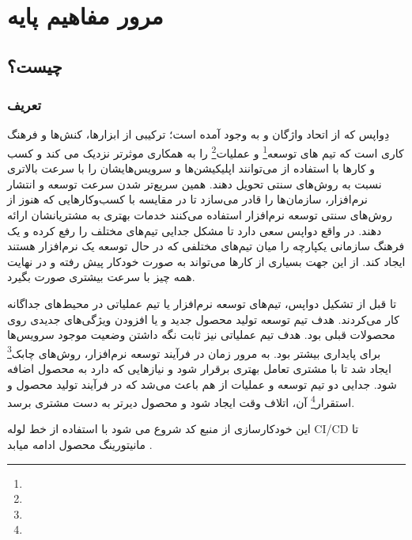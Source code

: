 \chapter{مرور مفاهیم پایه}

\section[مرو مفاهیم پایه]{ چیست؟}

\subsection{تعریف}
دِواپس که از اتحاد واژگان 
 و
به وجود آمده است؛ ترکیبی از ابزارها، کنش‌ها و فرهنگ کاری است که تیم های توسعه\footnote{} و عملیات\footnote{} را به همکاری موثرتر نزدیک می کند و کسب و کارها با استفاده از می‌توانند اپلیکیشن‌ها و سرویس‌هایشان را با سرعت بالاتری نسبت به روش‌های سنتی تحویل دهند. همین سریع‌تر شدن سرعت توسعه و انتشار نرم‌افزار، سازمان‌ها را قادر می‌سازد تا در مقایسه با کسب‌وکارهایی که هنوز از روش‌های سنتی توسعه نرم‌افزار استفاده می‌کنند خدمات بهتری به مشتریانشان ارائه دهند. در واقع دواپس سعی دارد تا مشکل جدایی تیم‌های مختلف را رفع کرده و یک فرهنگ سازمانی یکپارچه را میان تیم‌های مختلفی که در حال توسعه یک نرم‌افزار هستند ایجاد کند. از این جهت بسیاری از کارها می‌تواند به صورت خودکار پیش رفته و در نهایت همه چیز با سرعت بیشتری صورت بگیرد\cite{Devops2,Devops3}. 

تا قبل از تشکیل دواپس، تیم‌های توسعه نرم‌افزار یا تیم عملیاتی در محیط‌های جداگانه کار می‌کردند. هدف تیم توسعه تولید محصول جدید و یا افزودن ویژگی‌های جدیدی روی محصولات قبلی بود. هدف تیم عملیاتی نیز ثابت نگه داشتن وضعیت موجود سرویس‌ها برای پایداری بیشتر بود. به مرور زمان در فرآیند توسعه نرم‌افزار، روش‌های چابک\footnote{}
ایجاد شد تا با مشتری تعامل بهتری برقرار شود و نیازهایی که دارد به محصول اضافه شود. جدایی دو تیم توسعه و عملیات از هم باعث می‌شد که در فرآیند تولید محصول و استقرار\footnote{} آن، اتلاف وقت ایجاد شود و محصول دیرتر به دست مشتری برسد.

این خودکارسازی از منبع کد شروع می شود با استفاده از خط لوله CI/CD  تا مانیتورینگ محصول ادامه میابد \cite{Devops1}.

